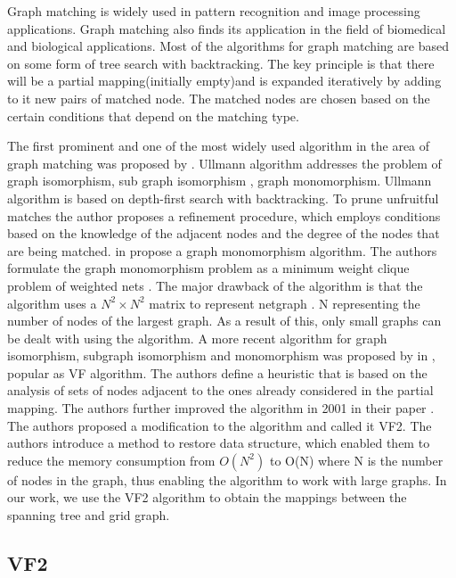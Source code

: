 Graph matching is widely used in pattern recognition and image processing applications. Graph matching also finds its application in the field of biomedical and biological applications. 
Most of the algorithms for graph matching are based on some form of tree search with backtracking.
 The key principle is that there will be a partial mapping(initially empty)and is expanded iteratively by adding to it new pairs of matched node. The matched nodes are chosen based on the certain conditions that depend on the matching type.

The first prominent and one of the most widely used algorithm in the area of graph matching was proposed by \citeauthor{Ullmann:1976:ASI:321921.321925} \cite{Ullmann:1976:ASI:321921.321925}. Ullmann algorithm addresses the problem of graph isomorphism, sub graph isomorphism , graph monomorphism. Ullmann algorithm is based on  depth-first search with backtracking. To prune unfruitful matches the author proposes a refinement procedure, which employs conditions based on the knowledge of the adjacent nodes and the degree of the nodes that are being matched. 
\citeauthor{4308468} in \cite{4308468} propose a graph monomorphism algorithm. The authors formulate the graph monomorphism problem as a minimum weight clique problem of weighted nets . The major drawback of the algorithm is that the algorithm uses a $N^2 \times N^2$ matrix to represent netgraph
. N representing the number of nodes of the largest graph. As a result of this, only small graphs can be dealt with using the algorithm.  
A more recent algorithm for graph isomorphism, subgraph isomorphism and monomorphism was proposed by \citeauthor{906251} in \cite{906251}, popular as VF algorithm. The authors define a heuristic that is based on the analysis of sets of nodes adjacent to the ones already considered in the partial mapping. The authors further improved the algorithm in 2001 in their paper \cite{cordella2001improved}. 
The authors proposed a modification to the algorithm and called it VF2. The authors introduce a method to restore data structure, which enabled them to reduce the memory consumption from $O(N^2)$ to O(N) where N is the number of nodes in the graph, thus enabling the algorithm to work with large graphs.
In our work, we use the VF2 algorithm to obtain the mappings between the spanning tree and grid graph.

\subsection{VF2}

